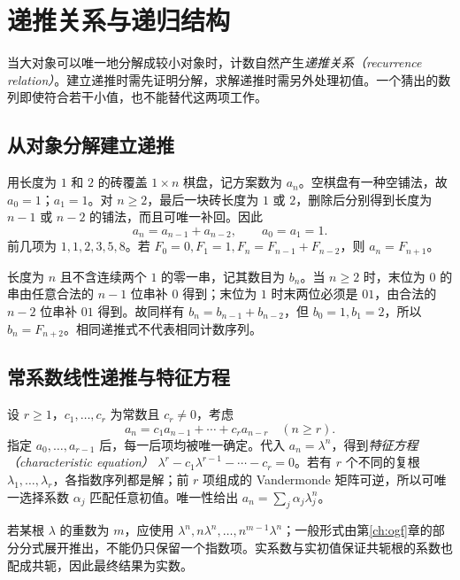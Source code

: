 \setcounter{chapter}{5} %
\chapter{递推关系与递归结构}
\label{ch:recurrences}

当大对象可以唯一地分解成较小对象时，计数自然产生\emph{递推关系（recurrence relation）}。建立递推时需先证明分解，求解递推时需另外处理初值。一个猜出的数列即使符合若干小值，也不能替代这两项工作。

\section{从对象分解建立递推}

用长度为 $1$ 和 $2$ 的砖覆盖 $1\times n$ 棋盘，记方案数为 $a_n$。空棋盘有一种空铺法，故 $a_0=1$；$a_1=1$。对 $n\ge2$，最后一块砖长度为 $1$ 或 $2$，删除后分别得到长度为 $n-1$ 或 $n-2$ 的铺法，而且可唯一补回。因此
\begin{equation}
  a_n=a_{n-1}+a_{n-2},\qquad a_0=a_1=1.
  \label{eq:tiling-recurrence}
\end{equation}
前几项为 $1,1,2,3,5,8$。若 $F_0=0,F_1=1,F_n=F_{n-1}+F_{n-2}$，则 $a_n=F_{n+1}$。

长度为 $n$ 且不含连续两个 $1$ 的零一串，记其数目为 $b_n$。当 $n\ge2$ 时，末位为 $0$ 的串由任意合法的 $n-1$ 位串补 $0$ 得到；末位为 $1$ 时末两位必须是 $01$，由合法的 $n-2$ 位串补 $01$ 得到。故同样有 $b_n=b_{n-1}+b_{n-2}$，但 $b_0=1,b_1=2$，所以 $b_n=F_{n+2}$。相同递推式不代表相同计数序列。

\section{常系数线性递推与特征方程}

设 $r\ge1$，$c_1,\ldots,c_r$ 为常数且 $c_r\ne0$，考虑
\[
  a_n=c_1a_{n-1}+\cdots+c_ra_{n-r}\quad(n\ge r).
\]
指定 $a_0,\ldots,a_{r-1}$ 后，每一后项均被唯一确定。代入 $a_n=\lambda^n$，得到\emph{特征方程（characteristic equation）} $\lambda^r-c_1\lambda^{r-1}-\cdots-c_r=0$。若有 $r$ 个不同的复根 $\lambda_1,\ldots,\lambda_r$，各指数序列都是解；前 $r$ 项组成的 Vandermonde 矩阵可逆，所以可唯一选择系数 $\alpha_j$ 匹配任意初值。唯一性给出 $a_n=\sum_j\alpha_j\lambda_j^n$。

若某根 $\lambda$ 的重数为 $m$，应使用 $\lambda^n,n\lambda^n,\ldots,n^{m-1}\lambda^n$；一般形式由第\ref{ch:ogf}章的部分分式展开推出，不能仍只保留一个指数项。实系数与实初值保证共轭根的系数也配成共轭，因此最终结果为实数。


